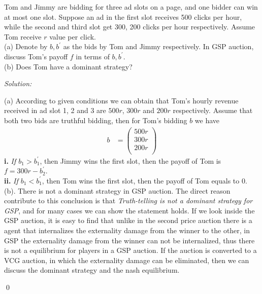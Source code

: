 \documentclass[12pt]{article}
\newenvironment{problem}[2][Problem]{\begin{trivlist}
\item[\hskip \labelsep {\bfseries #1}\hskip \labelsep {\bfseries #2.}]}{\end{trivlist}}
\newenvironment{sol}
    {\emph{Solution:}
    }
    {
    \qed
    }
\begin{document}
\begin{problem}{3}
	Tom and Jimmy are bidding for three ad slots on a page, and one bidder can win at most one slot. Suppose an ad in the first slot receives 500 clicks per hour, while the second and third slot get 300, 200 clicks per hour respectively. Assume Tom receive $r$ value per click. \\
	(a) Denote by $b, b^\prime$ as the bids by Tom and Jimmy respectively. In GSP auction, discuss Tom's payoff $ f $ in terms of $ b, b^\prime $.\\
	(b) Does Tom have a dominant strategy?
\end{problem}
\begin{sol}
	(a) According to given conditions we can obtain that Tom's hourly revenue received in ad slot 1, 2 and 3 are $500r$, $300r$ and $200r$ respectively. Assume that both two bids are truthful bidding, then for Tom's bidding $b$ we have 
	\begin{align*}
		b &= \begin{pmatrix}
		500r \\ 300r \\ 200r \\
		\end{pmatrix}
	\end{align*}
	\textbf{i.} \textit{If $b_1 > b_1^\prime$}, then Jimmy wins the first slot, then the payoff of Tom is $f = 300r - b_2^\prime$. \\
	\textbf{ii.} \textit{If $b_1 < b_1^\prime$}, then Tom wins the first slot, then the payoff of Tom equals to 0.\\
	(b). There is not a dominant strategy in GSP auction. The direct reason contribute to this conclusion is that \textit{Truth-telling is not a dominant strategy for GSP}, and for many cases we can show the statement holds. If we look inside the GSP auction, it is easy to find that unlike in the second price auction there is a agent that internalizes the externality damage from the winner to the other, in GSP the externality damage from the winner can not be internalized, thus there is not a equilibrium for players in a GSP auction. If the auction is converted to a VCG auction, in which the externality damage can be eliminated, then we can discuss the dominant strategy and the nash equilibrium. 
\end{sol}
\end{document}
